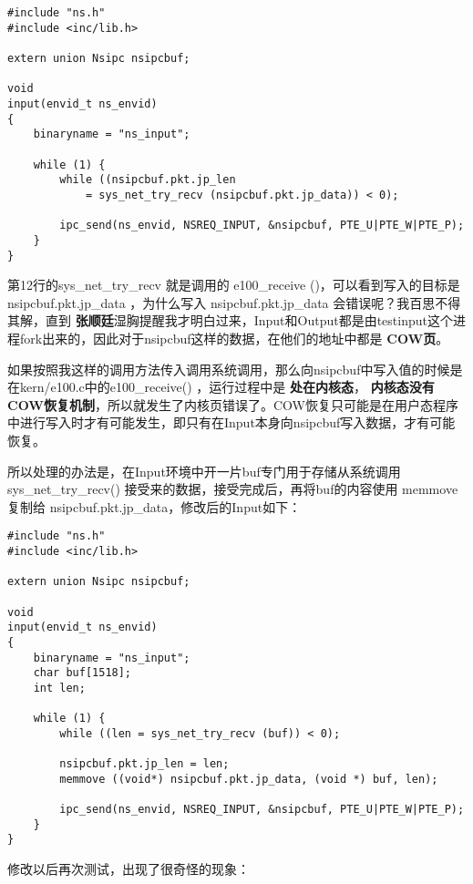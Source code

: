 \documentclass{article}
\newcommand{\highlight}[1]{{\bfseries \color{red}  #1}}
\newcommand{\funcname}[1]{{\ttfamily \small #1}}
\begin{document}
\begin{CJK*}{UTF8}{gkai}
\begin{lstlisting}[style=ccode, title={\scriptsize \ttfamily \bfseries net/input.c}]
#include "ns.h"
#include <inc/lib.h>

extern union Nsipc nsipcbuf;

void
input(envid_t ns_envid)
{
    binaryname = "ns_input";

    while (1) {
        while ((nsipcbuf.pkt.jp_len 
            = sys_net_try_recv (nsipcbuf.pkt.jp_data)) < 0);

        ipc_send(ns_envid, NSREQ_INPUT, &nsipcbuf, PTE_U|PTE_W|PTE_P);     
    }
}
\end{lstlisting}

第12行的sys\_net\_try\_recv 就是调用的 e100\_receive ()，可以看到写入的目标是  nsipcbuf.pkt.jp\_data ，为什么写入 nsipcbuf.pkt.jp\_data 会错误呢？我百思不得其解，直到\highlight{张顺廷}湿胸提醒我才明白过来，Input和Output都是由testinput这个进程fork出来的，因此对于nsipcbuf这样的数据，在他们的地址中都是\highlight{COW页}。

如果按照我这样的调用方法传入调用系统调用，那么向nsipcbuf中写入值的时候是在kern/e100.c中的\funcname{e100\_receive()} ，运行过程中是\highlight{处在内核态}，\highlight{内核态没有COW恢复机制}，所以就发生了内核页错误了。COW恢复只可能是在用户态程序中进行写入时才有可能发生，即只有在Input本身向nsipcbuf写入数据，才有可能恢复。

所以处理的办法是，在Input环境中开一片buf专门用于存储从系统调用 \funcname{ sys\_net\_try\_recv() } 接受来的数据，接受完成后，再将buf的内容使用 memmove 复制给 nsipcbuf.pkt.jp\_data，修改后的Input如下：

\begin{lstlisting}[style=ccode, title={\scriptsize \ttfamily \bfseries net/input.c}]
#include "ns.h"
#include <inc/lib.h>

extern union Nsipc nsipcbuf;

void
input(envid_t ns_envid)
{
    binaryname = "ns_input";
    char buf[1518];
    int len;

    while (1) {
        while ((len = sys_net_try_recv (buf)) < 0);

        nsipcbuf.pkt.jp_len = len;
        memmove ((void*) nsipcbuf.pkt.jp_data, (void *) buf, len);

        ipc_send(ns_envid, NSREQ_INPUT, &nsipcbuf, PTE_U|PTE_W|PTE_P);     
    }
}
\end{lstlisting}

修改以后再次测试，出现了很奇怪的现象：

\newpage


\end{CJK*}
\end{document}
